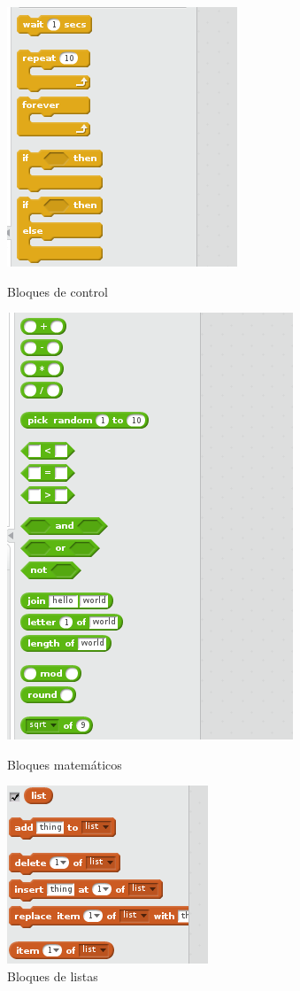 \begin{figure}[H]
	\begin{minipage}{0.33\textwidth}
    	\centering
    	\includegraphics[scale=0.40]{img/bloques-control.png}
     	\caption{Bloques de control}
  		\label{fig:bloques-control}
   	\end{minipage}\hfill
   	\begin {minipage}{0.33\textwidth}
     	\centering
     	\includegraphics[scale=0.40]{img/bloques-mat.png}
  		\caption{Bloques matemáticos}
  		\label{fig:bloques-mat}
	\end{minipage}
	\begin {minipage}{0.33\textwidth}
     	\centering
     	\includegraphics[scale=0.40]{img/bloques-listas.png}
     	\caption{Bloques de listas}
     	\label{fig:bloques-listas}
	\end{minipage}
\end{figure}
